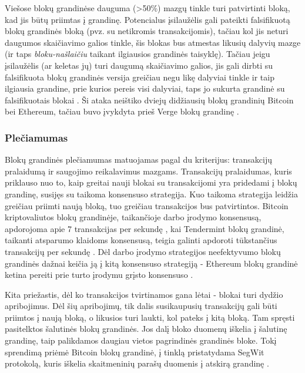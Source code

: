 Viešose blokų grandinėse dauguma (>50\%) mazgų tinkle turi patvirtinti bloką, kad jis būtų priimtas į grandinę. Potencialus įsilaužėlis gali pateikti
falsifikuotą blokų grandinės bloką (pvz. su netikromis transakcijomis), tačiau kol jis neturi daugumos skaičiavimo galios tinkle, šis blokas bus
atmestas likusių dalyvių mazge (ir taps \textit{bloku-našlaičiu} taikant ilgiausios grandinės taisyklę). Tačiau jeigu įsilaužėlis (ar keletas jų)
turi daugumą skaičiavimo galios, jis gali dirbti su falsifikuota blokų grandinės versija greičiau negu likę dalyviai tinkle ir taip ilgiausia grandine, prie kurios
pereis visi dalyviai, taps jo sukurta grandinė su falsifikuotais blokai \cite{Zheng2017}. Ši ataka neištiko dviejų didžiausių blokų grandinių Bitcoin bei Ethereum, tačiau
buvo įvykdyta prieš Verge blokų grandinę \cite{Sedgwick2018}.

\subsubsection{Plečiamumas}

Blokų grandinės plečiamumas matuojamas pagal du kriterijus: transakcijų pralaidumą ir saugojimo reikalavimus mazgams. Transakcijų pralaidumas, kuris priklauso nuo to,
kaip greitai nauji blokai su transakcijomi yra pridedami į blokų grandinę, susijęs su taikoma konsensuso strategija.
Kuo taikoma strategija leidžia greičiau priimti naują bloką, tuo greičiau transakcijos bus patvirtintos. Bitcoin kriptovaliutos blokų grandinėje, taikančioje darbo įrodymo konsensusą,
apdorojoma apie 7 transakcijas per sekundę \cite{Zheng2017}, kai Tendermint blokų grandinė, taikanti
atsparumo klaidoms konsensusą, teigia galinti apdoroti tūkstančius transakcijų per sekundę \cite{Tendermint2017}. Dėl darbo įrodymo strategijos neefektyvumo
blokų grandinės dažnai keičia ją į kitą konsensuso strategiją - Ethereum blokų grandinė ketina pereiti prie turto įrodymu grįsto konsensuso \cite{Ethereum}.

Kita priežastis, dėl ko transakcijos tvirtinamos gana lėtai - blokai turi dydžio apribojimus. Dėl šių apribojimų, tik dalis susikaupusių transakcijų gali būti priimtos
į naują bloką, o likusios turi laukti, kol pateks į kitą bloką. Tam spręsti pasitelktos šalutinės blokų grandinės. Jos dalį bloko duomenų iškelia į šalutinę grandinę,
taip palikdamos daugiau vietos pagrindinės grandinės bloke. Tokį sprendimą priėmė Bitcoin blokų grandinė, į tinklą pristatydama SegWit protokolą, kuris iškelia skaitmeninių
parašų duomenis į atskirą grandinę \cite{Segwit}.

